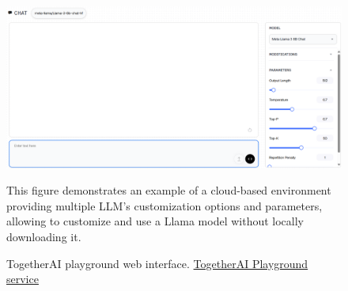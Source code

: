 \begin{figure}[H]
    \centering
    \includegraphics[width=\linewidth]{./figures/togetherai-playground.png}
    \caption{TogetherAI playground web interface. \href{https://api.together.ai/playground}{TogetherAI Playground service}}
    \begin{flushleft}
        This figure demonstrates an example of a cloud-based environment providing multiple LLM's customization options and parameters, allowing to customize and use a Llama model without locally downloading it.
    \end{flushleft}
\end{figure}
